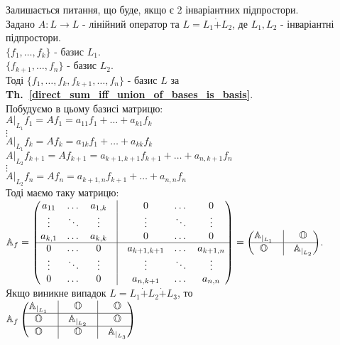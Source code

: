\documentclass[a4paper, 10pt]{article}
\theoremstyle{theoremdd}
\newcommand\thref[1]{\textbf{Th.~\ref{#1}}}
\begin{document}
\fi
\noindent
Залишається питання, що буде, якщо є 2 інваріантних підпростори.\\
Задано $A \colon L \to L$ - лінійний оператор та $L = L_1 \dot{+} L_2$, де $L_1,L_2$ - інваріантні підпростори.\\
$\{f_1,\dots,f_k\}$ - базис $L_1$.\\
$\{f_{k+1},\dots,f_{n}\}$ - базис $L_2$.\\
Тоді $\{f_1,\dots,f_k,f_{k+1},\dots,f_n\}$ - базис $L$ за \thref{direct_sum_iff_union_of_bases_is_basis}.\\
Побудуємо в цьому базисі матрицю:\\
$A|_{L_1}f_1 = Af_1 = a_{11}f_1 + \dots + a_{k1}f_k$\\
$\vdots$\\
$A|_{L_1}f_k = Af_k = a_{1k}f_1 + \dots + a_{kk}f_k$\\
$A|_{L_2}f_{k+1} = Af_{k+1} = a_{k+1,k+1}f_{k+1} + \dots + a_{n,k+1}f_n$\\
$\vdots$\\
$A|_{L_2}f_n = Af_n = a_{k+1,n}f_{k+1} + \dots + a_{n,n}f_n$\\
Тоді маємо таку матрицю:\\
$\mathbb{A}_f = \begin{pmatrix}
a_{11} & \dots & a_{1,k} & \vline & 0 & \dots & 0 \\
\vdots & \ddots & \vdots & \vline & \vdots & \ddots & \vdots \\
a_{k,1} & \dots & a_{k,k} & \vline & 0 & \dots & 0 \\
\hline
0 & \dots & 0 & \vline & a_{k+1,k+1} & \dots & a_{k+1, n} \\
\vdots & \ddots & \vdots & \vline & \vdots & \ddots & \vdots \\
0 & \dots & 0 & \vline & a_{n,k+1} & \dots & a_{n, n} \\
\end{pmatrix} = \begin{pmatrix}
\mathbb{A}_{|_{L_1}}  & \vline & \mathbb{O} \\
 \hline
 \mathbb{O} & \vline & \mathbb{A}_{|_{L_2}}
\end{pmatrix}$.
\bigskip \\
Якщо виникне випадок $L = L_1 \dot{+} L_2 \dot{+} L_3$, то\\
$\mathbb{A}_f \begin{pmatrix} 
\mathbb{A}_{|_{L_1}}  & \vline & \mathbb{O} & \vline & \mathbb{O} \\
 \hline
\mathbb{O}  & \vline & \mathbb{A}_{|_{L_2}} & \vline & \mathbb{O} \\
 \hline
\mathbb{O}  & \vline & \mathbb{O} & \vline & \mathbb{A}_{|_{L_3}} \\
\end{pmatrix}$
\end{document}

